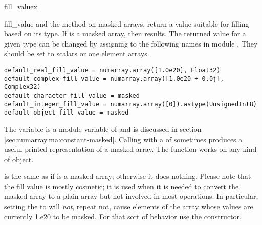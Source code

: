 \begin{funcdesc}{fill_value}{x}
\end{funcdesc}
\begin{methoddesc}[MaskedArray]{fill_value}{}
    and the method  on masked arrays,
   return a value suitable for filling  based on its type.  If 
   is a masked array, then  results. The returned value for
   a given type can be changed by assigning to the following names in module
   . They should be set to scalars or one element arrays.
\begin{verbatim}
default_real_fill_value = numarray.array([1.0e20], Float32)
default_complex_fill_value = numarray.array([1.0e20 + 0.0j], Complex32)
default_character_fill_value = masked
default_integer_fill_value = numarray.array([0]).astype(UnsignedInt8)
default_object_fill_value = masked
\end{verbatim}
   The variable  is a module variable of  and
   is discussed in section \ref{sec:numarray.ma:constant-masked}. Calling
    with a  of  sometimes
   produces a useful printed representation of a masked array.  The function
    works on any kind of object.
\end{methoddesc}

 is the same as  if 
   is a masked array; otherwise it does nothing. Please note that the fill
   value is mostly cosmetic; it is used when it is needed to convert the masked
   array to a plain \module{\numarray} array but not involved in most
   operations. In particular, setting the  to
    will \emph{not}, repeat not, cause elements of the array
   whose values are currently 1.e20 to be masked. For that sort of behavior use
   the  constructor.



